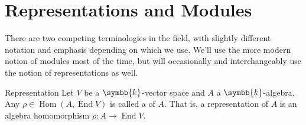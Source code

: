 \documentclass[fleqn]{NotesClass}
\renewcommand{\field}{\symbb{k}}
\DeclareMathOperator{\End}{End}
\DeclareMathOperator{\Hom}{Hom}
\begin{document}
    \section{Representations and Modules}
    \label{sec:representaitons and modules}
    There are two competing terminologies in the field, with slightly different notation and emphasis depending on which we use.
    We'll use the more modern notion of modules most of the time, but will occasionally and interchangeably use the notion of representations as well.
    
    \begin{dfn}{Representation}{}
        Let \(V\) be a \(\field\)-vector space and \(A\) a \(\field\)-algebra.
        Any \(\rho \in \Hom(A, \End V)\) is called a  of \(A\).
        That is, a representation of \(A\) is an algebra homomorphism \(\rho \colon A \to \End V\).
    \end{dfn}
    
\end{document}
